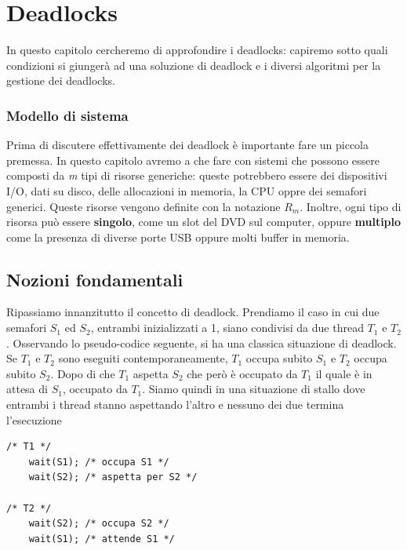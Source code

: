 \pagebreak
\section{Deadlocks} \label{deadlocks}
In questo capitolo cercheremo di approfondire i deadlocks: capiremo sotto quali condizioni si giungerà ad una soluzione di deadlock e i diversi algoritmi per la gestione dei deadlocks.

\subsubsection*{Modello di sistema}
Prima di discutere effettivamente dei deadlock è importante fare un piccola premessa. In questo capitolo avremo a che fare con sistemi che possono essere composti da \textit{m} tipi di risorse generiche: queste potrebbero essere dei dispositivi I/O, dati su disco, delle allocazioni in memoria, la CPU oppre dei semafori generici. Queste risorse vengono definite con la notazione $R_m$. Inoltre, ogni tipo di risorsa può essere \textbf{singolo}, come un slot del DVD sul computer, oppure \textbf{multiplo} come la presenza di diverse porte USB oppure molti buffer in memoria.
% 
\subsection{Nozioni fondamentali}
Ripassiamo innanzitutto il concetto di deadlock. Prendiamo il caso in cui due semafori $S_1$ ed $S_2$, entrambi inizializzati a 1, siano condivisi da due thread $T_1$ e $T_2$. Osservando lo pseudo-codice seguente, si ha una classica situazione di deadlock. Se $T_1$ e $T_2$ sono eseguiti contemporaneamente, $T_1$ occupa subito $S_1$ e $T_2$ occupa subito $S_2$. Dopo di che $T_1$ aspetta $S_2$ che però è occupato da $T_1$ il quale è in attesa di $S_1$, occupato da $T_1$. Siamo quindi in una situazione di stallo dove entrambi i thread stanno aspettando l'altro e nessuno dei due termina l'esecuzione

\begin{lstlisting}[caption = {Classica situazione di deadlock}]
/* T1 */
    wait(S1); /* occupa S1 */
    wait(S2); /* aspetta per S2 */

/* T2 */
    wait(S2); /* occupa S2 */
    wait(S1); /* attende S1 */
\end{lstlisting}
% 

% 
